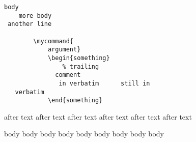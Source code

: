 \begin{verbatim}
body
    more body
 another line

        \mycommand{
            argument}
            \begin{something}
                % trailing
              comment
               in verbatim      still in 
   verbatim
            \end{something}
    \end{verbatim}

after text after text 
after text after text 
after text after text 
\begin{not}
	body body body
	body body body
	body body body
\end{not}
